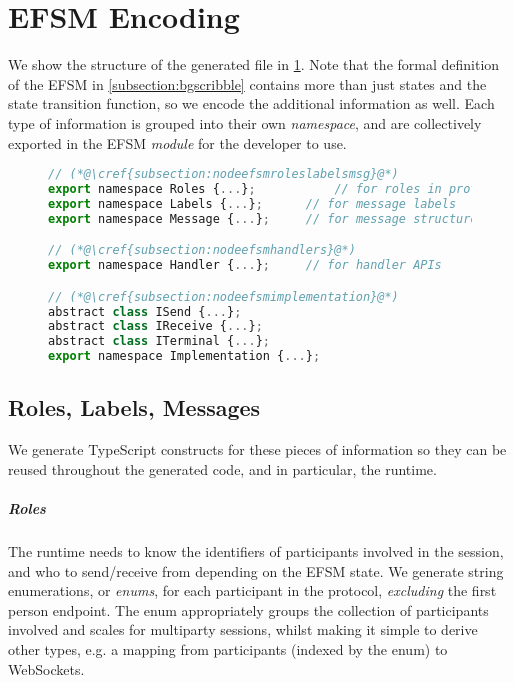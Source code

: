 \section{EFSM Encoding}
\label{section:nodeefsm}

We show the structure of the generated 
file in
\cref{lst:nodeefsmfile}.
Note that the formal definition of the EFSM in 
\cref{subsection:bgscribble}
contains more than just states and the state transition function,
so we encode the additional information as well.
Each type of information is grouped into their own
\textit{namespace}, and are collectively exported in
the EFSM \textit{module} for the developer to use.

\begin{figure}
\begin{lstlisting}[language=javascript,tabsize=2,title=EFSM.ts]
// (*@\cref{subsection:nodeefsmroleslabelsmsg}@*)
export namespace Roles {...};			// for roles in protocol
export namespace Labels {...};		// for message labels
export namespace Message {...};		// for message structure

// (*@\cref{subsection:nodeefsmhandlers}@*)
export namespace Handler {...};		// for handler APIs

// (*@\cref{subsection:nodeefsmimplementation}@*)
abstract class ISend {...};
abstract class IReceive {...};
abstract class ITerminal {...};
export namespace Implementation {...};
\end{lstlisting}
\label{lst:nodeefsmfile}
\end{figure}

\subsection{Roles, Labels, Messages}
\label{subsection:nodeefsmroleslabelsmsg}

We generate TypeScript constructs for these pieces of information
so they can be reused throughout the generated code, 
and in particular, the runtime.

\subparagraph{Roles}
The runtime needs to know the identifiers of participants involved
in the session, and who to send/receive from 
depending on the EFSM state.
We generate string enumerations, or \textit{enums}, for each 
participant in the protocol, \textit{excluding} the 
first person endpoint. 
The enum appropriately groups the collection
of participants involved and scales for multiparty sessions,
whilst making it simple to derive other types, e.g. a mapping from
participants (indexed by the enum) to WebSockets.


